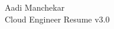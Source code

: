 \documentclass{article}
\begin{document}
\begin{center}
    \Huge Aadi Manchekar \\
    \Large Cloud Engineer Resume v3.0
\end{center}
\end{document}
